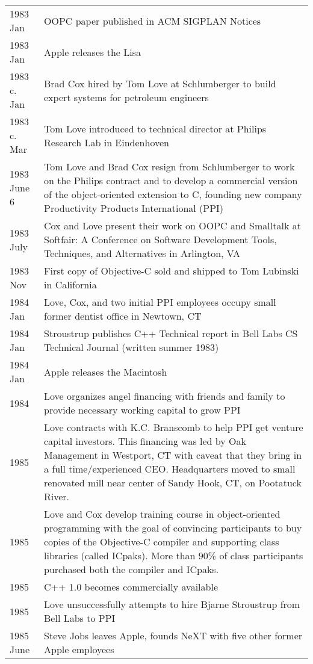 \documentclass[acmsmall,screen]{acmart}
\begin{document}
\begin{longtable}{lp{4.40in}}
1983 Jan	& OOPC paper published in ACM SIGPLAN Notices \\
1983 Jan	& Apple releases the Lisa \\
1983 c. Jan	& Brad Cox hired by Tom Love at Schlumberger to build expert systems for petroleum engineers \\
1983 c. Mar	& Tom Love introduced to technical director at Philips Research Lab in Eindenhoven \\
1983 June 6	& Tom Love and Brad Cox resign from Schlumberger to work on the Philips contract and to develop a commercial version of the object-oriented extension to C, founding new company Productivity Products International (PPI) \\
1983 July	& Cox and Love present their work on OOPC and Smalltalk at Softfair: A Conference on Software Development Tools, Techniques, and Alternatives in Arlington, VA \\
1983 Nov	& First copy of Objective-C sold and shipped to Tom Lubinski in California \\
1984 Jan	& Love, Cox, and two initial PPI employees occupy small former dentist office in Newtown, CT \\
1984 Jan 	& Stroustrup publishes C++ Technical report in Bell Labs CS Technical Journal (written summer 1983) \\
1984 Jan	& Apple releases the Macintosh \\
1984	& Love organizes angel financing with friends and family to provide necessary working capital to grow PPI \\
1985	& Love contracts with K.C. Branscomb to help PPI get venture capital investors. This financing was led by Oak Management in Westport, CT with caveat that they bring in a full time/experienced CEO. Headquarters moved to small renovated mill near center of Sandy Hook, CT, on Pootatuck River. \\
1985	& Love and Cox develop training course in object-oriented programming with the goal of convincing participants to buy copies of the Objective-C compiler and supporting class libraries (called ICpaks). More than 90\% of class participants purchased both the compiler and ICpaks. \\
1985 	& C++ 1.0 becomes commercially available \\
1985	& Love unsuccessfully attempts to hire Bjarne Stroustrup from Bell Labs to PPI \\
1985 June	& Steve Jobs leaves Apple, founds NeXT with five other former Apple employees \\

\end{longtable}
\end{document}
